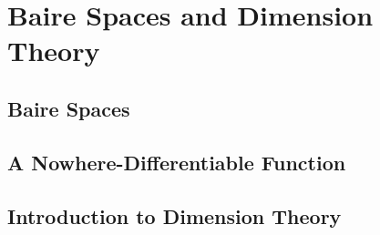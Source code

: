 \chapter{Baire Spaces and Dimension Theory}

\section{Baire Spaces}

\section{A Nowhere-Differentiable Function}

\section{Introduction to Dimension Theory}
